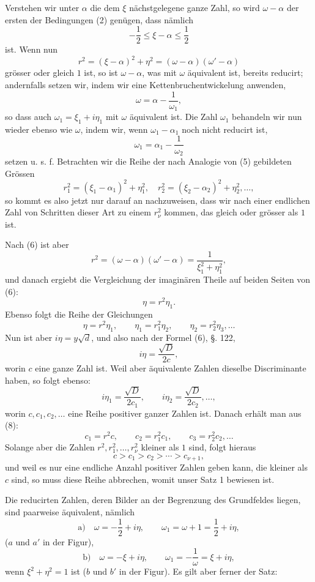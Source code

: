 \documentclass[11pt]{article}
\begin{document}
Verstehen wir unter $\alpha$ die dem $\xi$ nächstgelegene ganze Zahl, so wird $\omega-\alpha$ der ersten der Bedingungen (2) genügen, dass nämlich
\[
        -\frac12\le \xi-\alpha\le\frac12
\]
ist. Wenn nun
\[
\tag{5}        r^2=(\xi-\alpha)^2+\eta^2=(\omega-\alpha)(\omega'-\alpha)
\]
grösser oder gleich $1$ ist, so ist $\omega-\alpha$, was mit $\omega$ äquivalent ist, bereits reducirt; andernfalls setzen wir, indem wir eine Kettenbruchentwickelung anwenden,
\[
\tag{6}        \omega=\alpha-\frac1{\omega_1},
\]
so dass auch $\omega_1=\xi_1+i\eta_1$ mit $\omega$ äquivalent ist. Die Zahl $\omega_1$ behandeln wir nun wieder ebenso wie $\omega$, indem wir, wenn $\omega_1-\alpha_1$ noch nicht reducirt ist,
\[
\tag{7}        \omega_1=\alpha_1-\frac1{\omega_2}
\]
setzen u. s. f. Betrachten wir die Reihe der nach Analogie von (5) gebildeten Grössen
\[
        r_1^2=(\xi_1-\alpha_1)^2+\eta_1^2,
        \quad
        r_2^2=(\xi_2-\alpha_2)^2+\eta_2^2,
        \ldots,
\]
so kommt es also jetzt nur darauf an nachzuweisen, dass wir nach einer endlichen Zahl von Schritten dieser Art zu einem $r_\nu^2$ kommen, das gleich oder grösser als $1$ ist.

Nach (6) ist aber
\[
        r^2=(\omega-\alpha)(\omega'-\alpha)=\frac1{\xi_1^2+\eta_1^2},
\]
und danach ergiebt die Vergleichung der imaginären Theile auf beiden Seiten von (6):
\[
        \eta=r^2\eta_1.
\]
Ebenso folgt die Reihe der Gleichungen
\[
\tag{8}        \eta=r^2\eta_1,
        \qquad
        \eta_1=r_1^2\eta_2,
        \qquad
        \eta_2=r_2^2\eta_3,\ldots
\]
Nun ist aber $i\eta=y\sqrt d$, und also nach der Formel (6), §. 122,
\[
        i\eta=\frac{\sqrt D}{2c},
\]
worin $c$ eine ganze Zahl ist. Weil aber äquivalente Zahlen dieselbe Discriminante haben, so folgt ebenso:
\[
        i\eta_1=\frac{\sqrt D}{2c_1},
        \qquad
        i\eta_2=\frac{\sqrt D}{2c_2},\ldots,
\]
worin $c,c_1,c_2,\ldots$ eine Reihe positiver ganzer Zahlen ist. Danach erhält man aus (8):
\[
\tag{9}        c_1=r^2c,
        \qquad
        c_2=r_1^2c_1,
        \qquad
        c_3=r_2^2c_2,\ldots
\]
Solange aber die Zahlen $r^2,r_1^2,\ldots,r_\nu^2$ kleiner als $1$ sind, folgt hieraus
\[
\tag{10}       c>c_1>c_2>\cdots>c_{\nu+1},
\]
und weil es nur eine endliche Anzahl positiver Zahlen geben kann, die kleiner als $c$ sind, so muss diese Reihe abbrechen, womit unser Satz 1 bewiesen ist.

Die reducirten Zahlen, deren Bilder an der Begrenzung des Grundfeldes liegen, sind paarweise äquivalent, nämlich
\[
\text{a)}\quad \omega=-\frac12+i\eta,
\qquad
\omega_1=\omega+1=\frac12+i\eta,
\]
($a$ und $a'$ in der Figur),
\[
\text{b)}\quad \omega=-\xi+i\eta,
\qquad
\omega_1=-\frac1\omega=\xi+i\eta,
\]
wenn $\xi^2+\eta^2=1$ ist ($b$ und $b'$ in der Figur). Es gilt aber ferner der Satz:
\end{document}

